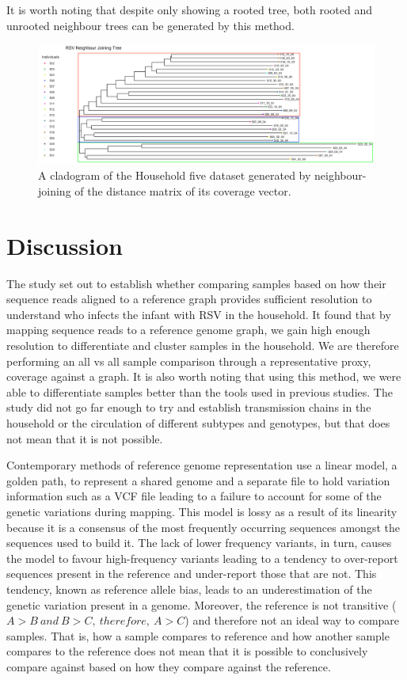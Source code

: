 \documentclass[10pt, a4paper]{article}
\begin{document}
It is worth noting that despite only showing a rooted tree, both rooted and
unrooted neighbour trees can be generated by this method.

\begin{figure}
\centering
\includegraphics[width=1.0\textwidth]{../Figures/hh20-clado.png}
\caption[A cladogram of RSV]{\label{fig:orge036e7e}A cladogram of the Household five dataset generated by neighbour-joining of the distance matrix of its coverage vector.}
\end{figure}
\newpage
\section{Discussion}
\label{sec:orge80901b}
The study set out to establish whether comparing samples based on how their
sequence reads aligned to a reference graph provides sufficient resolution to
understand who infects the infant with RSV in the household.
It found that by mapping sequence reads to a reference genome graph, we gain
high enough resolution to differentiate and cluster samples in the household.
We are therefore performing an all vs all sample comparison through a
representative proxy, coverage against a graph.
It is also worth noting that using this method, we were able to differentiate
samples better than the tools used in previous studies.
The study did not go far enough to try and establish transmission chains in the
household or the circulation of different subtypes and genotypes, but that does
not mean that it is not possible.

Contemporary methods of reference genome representation use a linear model, a
golden path, to represent a shared genome and a separate file to hold variation
information such as a VCF file leading to a failure to account for some of the
genetic variations during mapping.
This model is lossy as a result of its linearity because it is a consensus of
the most frequently occurring sequences amongst the sequences used to build it.
The lack of lower frequency variants, in turn, causes the model to favour
high-frequency variants leading to a tendency to over-report sequences present
in the reference and under-report those that are not.
This tendency, known as reference allele bias, leads to an underestimation of
the genetic variation present in a genome. Moreover, the reference is not
transitive (\(A>B\ and\ B>C,\ therefore,\ A>C\)) and therefore not an ideal way to compare samples.
That is, how a sample  compares to reference and how another sample  compares to
the reference does not mean that it is possible to conclusively compare  against
based on how they compare against the reference.
\end{document}
